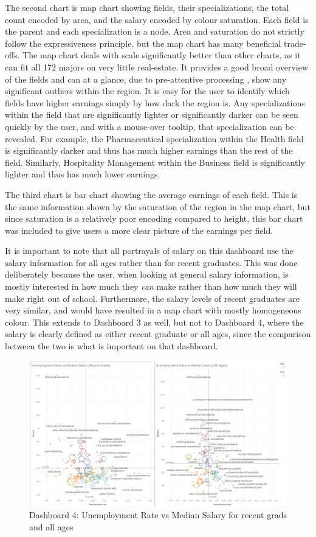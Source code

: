 \documentclass[sigchi]{acmart}
\begin{document}
The second chart is map chart showing fields, their specializations, the total count encoded by area, and the salary encoded by colour saturation. Each field is the parent and each specialization is a node. Area and saturation do not strictly follow the expressiveness principle, but the map chart has many beneficial trade-offs. The map chart deals with scale significantly better than other charts, as it can fit all 172 majors on very little real-estate. It provides a good broad overview of the fields and can at a glance, due to pre-attentive processing \cite{munzner}, show any significant outliers within the region. It is easy for the user to identify which fields have higher earnings simply by how dark the region is. Any specializations within the field that are significantly lighter or significantly darker can be seen quickly by the user, and with a mouse-over tooltip, that specialization can be revealed. For example, the Pharmaceutical specialization within the Health field is significantly darker and thus has much higher earnings than the rest of the field. Similarly, Hospitality Management within the Business field is significantly lighter and thus has much lower earnings.

The third chart is bar chart showing the average earnings of each field. This is the same information shown by the saturation of the region in the map chart, but since saturation is a relatively poor encoding compared to height, this bar chart was included to give users a more clear picture of the earnings per field.

It is important to note that all portrayals of salary on this dashboard use the salary information for all ages rather than for recent graduates. This was done deliberately because the user, when looking at general salary information, is mostly interested in how much they \textit{can} make rather than how much they will make right out of school. Furthermore, the salary levels of recent graduates are very similar, and would have resulted in a map chart with mostly homogeneous colour. This extends to Dashboard 3 as well, but not to Dashboard 4, where the salary is clearly defined as either recent graduate or all ages, since the comparison between the two is what is important on that dashboard.

\begin{figure}[thpb]
  \includegraphics[width=1.0\textwidth]{DB4.png}
     \caption{Dashboard 4: Unemployment Rate vs Median Salary for recent grads and all ages}
         \label{fig:db4}
  \end{figure}
  
\end{document}
